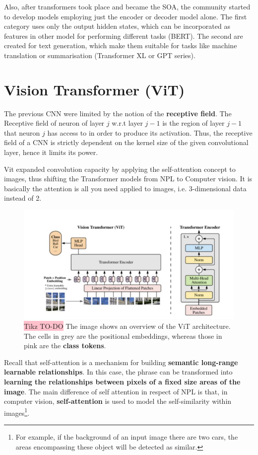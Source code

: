 Also, after transformers took place and became the SOA, the community started to develop models employing just the encoder or decoder model alone. The first category  uses only the output hidden states, which can be incorporated as features in other model for performing different tasks (BERT). The second are created for text generation, which make them suitable for tasks like machine translation or summarisation (Transformer XL or GPT series).

\section{Vision Transformer (ViT)}

The previous CNN were limited by the notion of the \textbf{receptive field}. The Receptive field of neuron  of layer $j$ w.r.t layer $j−1$ is the
region of layer $j−1$ that neuron $j$ has access to in order to produce its activation. Thus, the receptive field of a CNN is strictly dependent on the kernel size of the given convolutional layer, hence it limits its power.

Vit expanded convolution capacity by applying the self-attention concept to images, thus shifting the Transformer models from NPL to Computer vision. It is basically the attention is all you need applied to images, i.e. 3-dimensional data instead of 2.

\begin{figure}[H]
    \centering
    \includegraphics[width=\linewidth]{tikz/ViT.png}
    \caption{{\color{red}\colorbox{pink}{Tikz TO-DO}} The image shows an overview of the ViT architecture. The cells in grey are the positional embeddings, whereas those in pink are the \textbf{class tokens}.}
    \label{fig:ViT}
\end{figure}

Recall that self-attention is a mechanism for building \textbf{semantic
long-range learnable relationships}. In this case, the phrase can be transformed into \textbf{learning the relationships between pixels of a fixed size areas of the image}.
The main difference of self attention in respect of NPL is that, in computer vision, \textbf{self-attention} is used to model the
self-similarity within images\footnote{For example, if the background of an input image there are two cars, the areas encompassing these object will be detected as similar.}.

